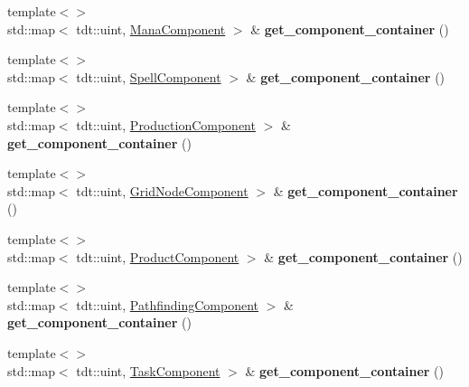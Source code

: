\begin{DoxyCompactItemize}
\item 
{\footnotesize template$<$$>$ }\\std\+::map$<$ tdt\+::uint, \hyperlink{struct_mana_component}{Mana\+Component} $>$ \& {\bfseries get\+\_\+component\+\_\+container} ()\hypertarget{class_entity_system_a9ca93121683f21ad2046c2a208922d09}{}\label{class_entity_system_a9ca93121683f21ad2046c2a208922d09}

\item 
{\footnotesize template$<$$>$ }\\std\+::map$<$ tdt\+::uint, \hyperlink{struct_spell_component}{Spell\+Component} $>$ \& {\bfseries get\+\_\+component\+\_\+container} ()\hypertarget{class_entity_system_ac406af2b870d1a2615b134c391ad5099}{}\label{class_entity_system_ac406af2b870d1a2615b134c391ad5099}

\item 
{\footnotesize template$<$$>$ }\\std\+::map$<$ tdt\+::uint, \hyperlink{struct_production_component}{Production\+Component} $>$ \& {\bfseries get\+\_\+component\+\_\+container} ()\hypertarget{class_entity_system_a96157aaaab85d53a67996908b985d3d5}{}\label{class_entity_system_a96157aaaab85d53a67996908b985d3d5}

\item 
{\footnotesize template$<$$>$ }\\std\+::map$<$ tdt\+::uint, \hyperlink{struct_grid_node_component}{Grid\+Node\+Component} $>$ \& {\bfseries get\+\_\+component\+\_\+container} ()\hypertarget{class_entity_system_a573199f54220d256f634d096d56f4340}{}\label{class_entity_system_a573199f54220d256f634d096d56f4340}

\item 
{\footnotesize template$<$$>$ }\\std\+::map$<$ tdt\+::uint, \hyperlink{struct_product_component}{Product\+Component} $>$ \& {\bfseries get\+\_\+component\+\_\+container} ()\hypertarget{class_entity_system_ac32a639180e04c61e378c8ae204f3b7a}{}\label{class_entity_system_ac32a639180e04c61e378c8ae204f3b7a}

\item 
{\footnotesize template$<$$>$ }\\std\+::map$<$ tdt\+::uint, \hyperlink{struct_pathfinding_component}{Pathfinding\+Component} $>$ \& {\bfseries get\+\_\+component\+\_\+container} ()\hypertarget{class_entity_system_aed11982a65e630b80142c2beda45da8b}{}\label{class_entity_system_aed11982a65e630b80142c2beda45da8b}

\item 
{\footnotesize template$<$$>$ }\\std\+::map$<$ tdt\+::uint, \hyperlink{struct_task_component}{Task\+Component} $>$ \& {\bfseries get\+\_\+component\+\_\+container} ()\hypertarget{class_entity_system_a19a63bfab77a3f46c139729e3b24d0fb}{}\label{class_entity_system_a19a63bfab77a3f46c139729e3b24d0fb}


\end{DoxyCompactItemize}
